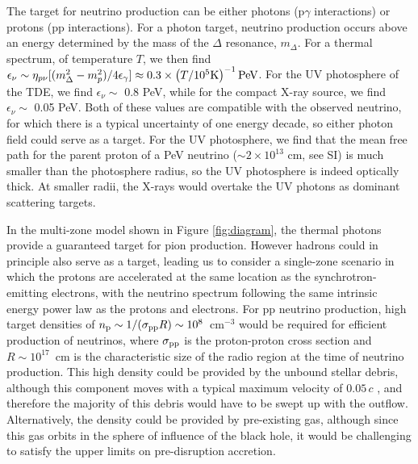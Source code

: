 The target for neutrino production can be either photons (p$\gamma$ interactions) or protons (pp interactions). For a photon target, neutrino production occurs above an energy determined by the mass of the $\Delta$ resonance, $m_{\Delta}$. For a thermal spectrum, of temperature $T$, we then find $\epsilon_{\nu} \sim \eta_{p\nu}[(m_{\Delta}^{2} - m_{p}^{2})/ 4 \epsilon_\gamma ] \approx 0.3 \times \left(T/10^{5} \textup{K} \right)^{-1} \textup{PeV}$. For the UV photosphere of the TDE, we find $\epsilon_\nu \sim$ 0.8 PeV, while for the compact X-ray source, we find $\epsilon_\nu \sim$ 0.05 PeV. Both of these values are compatible with the observed neutrino, for which there is a typical uncertainty of one energy decade\cite{2018Sci...361.1378I}, so either photon field could serve as a target. For the UV photosphere, we find that the mean free path for the parent proton of a PeV neutrino ($\sim2 \times 10^{13}$ cm, see SI) is much smaller than the photosphere radius, so the UV photosphere is indeed optically thick. At smaller radii, the X-rays would overtake the UV photons as dominant scattering targets. 

In the multi-zone model shown in Figure \ref{fig:diagram}, the thermal photons provide a guaranteed target for pion production. However hadrons could in principle also serve as a target, leading us to consider a single-zone scenario in which the protons are accelerated at the same location as the synchrotron-emitting electrons, with the neutrino spectrum following the same intrinsic energy power law as the protons and electrons. For pp neutrino production, high target densities of $n_{\textup{p}}\sim 1/(\sigma_{\textup{pp}} R)\sim 10^8$~cm$^{-3}$ would be required for efficient production of neutrinos, where $\sigma_{\textup{pp}}$ is the proton-proton cross section and $R \sim 10^{17}$~cm is the characteristic size of the radio region at the time of neutrino production. This high density could be provided by the unbound stellar debris, although this component moves with a typical maximum velocity\cite{2016ApJ...827..127K} of $0.05\,c$ , and therefore the majority of this debris would have to be swept up with the outflow. Alternatively, the density could be provided by pre-existing gas, although since this gas orbits in the sphere of influence of the black hole, it would be challenging to satisfy the upper limits on pre-disruption accretion. 

